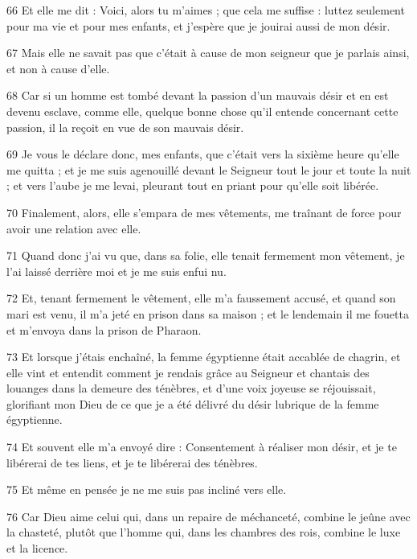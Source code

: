 \par 66 Et elle me dit : Voici, alors tu m'aimes ; que cela me suffise : luttez seulement pour ma vie et pour mes enfants, et j'espère que je jouirai aussi de mon désir.

\par 67 Mais elle ne savait pas que c'était à cause de mon seigneur que je parlais ainsi, et non à cause d'elle.

\par 68 Car si un homme est tombé devant la passion d'un mauvais désir et en est devenu esclave, comme elle, quelque bonne chose qu'il entende concernant cette passion, il la reçoit en vue de son mauvais désir.

\par 69 Je vous le déclare donc, mes enfants, que c'était vers la sixième heure qu'elle me quitta ; et je me suis agenouillé devant le Seigneur tout le jour et toute la nuit ; et vers l'aube je me levai, pleurant tout en priant pour qu'elle soit libérée.

\par 70 Finalement, alors, elle s'empara de mes vêtements, me traînant de force pour avoir une relation avec elle.

\par 71 Quand donc j'ai vu que, dans sa folie, elle tenait fermement mon vêtement, je l'ai laissé derrière moi et je me suis enfui nu.

\par 72 Et, tenant fermement le vêtement, elle m'a faussement accusé, et quand son mari est venu, il m'a jeté en prison dans sa maison ; et le lendemain il me fouetta et m'envoya dans la prison de Pharaon.

\par 73 Et lorsque j'étais enchaîné, la femme égyptienne était accablée de chagrin, et elle vint et entendit comment je rendais grâce au Seigneur et chantais des louanges dans la demeure des ténèbres, et d'une voix joyeuse se réjouissait, glorifiant mon Dieu de ce que je a été délivré du désir lubrique de la femme égyptienne.

\par 74 Et souvent elle m'a envoyé dire : Consentement à réaliser mon désir, et je te libérerai de tes liens, et je te libérerai des ténèbres.

\par 75 Et même en pensée je ne me suis pas incliné vers elle.

\par 76 Car Dieu aime celui qui, dans un repaire de méchanceté, combine le jeûne avec la chasteté, plutôt que l'homme qui, dans les chambres des rois, combine le luxe et la licence.

